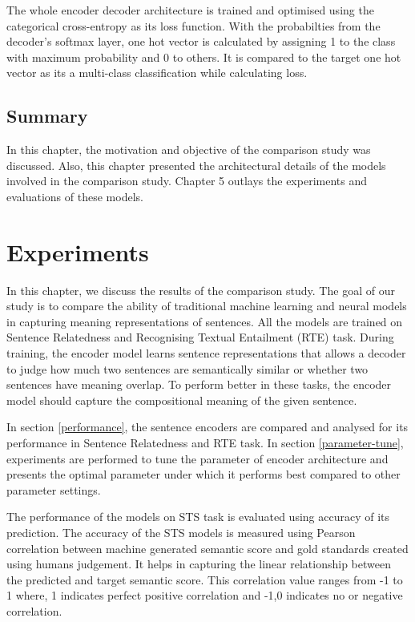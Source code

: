 \documentclass[12pt]{report} %
\begin{document}
	The whole encoder decoder architecture is trained  and optimised using the categorical cross-entropy as its loss function. With the probabilties from the decoder's softmax layer, one hot vector is calculated by assigning 1 to the class with maximum probability and 0 to others. It is compared to the target one hot vector as its a multi-class classification while calculating loss.
	
	\section{Summary}
	In this chapter, the motivation and objective of the comparison study was discussed. Also, this chapter presented the architectural details of the models involved in the comparison study. Chapter 5 outlays the experiments and evaluations of these models.
	
	  
	 
\chapter{Experiments}

 In this chapter, we discuss the results of the comparison study. The goal of our study is to compare the ability of traditional machine learning and neural models in capturing meaning representations of sentences. All the models are trained on Sentence Relatedness and Recognising Textual Entailment (RTE) task. During training, the encoder model learns sentence representations that allows a decoder to judge how much two sentences are semantically similar or whether two sentences have meaning overlap. To perform better in these tasks, the encoder model should capture the compositional meaning of the given sentence. 
 
 In section \ref{performance}, the sentence encoders are compared and analysed for its performance in Sentence Relatedness and RTE task. In section \ref{parameter-tune}, experiments are performed to tune the parameter of encoder architecture and presents the optimal parameter under which it performs best compared to other parameter
 settings.
 
 The performance of the models on STS task is evaluated using accuracy of its prediction. The accuracy of the STS models is measured using Pearson correlation between machine generated semantic score and gold standards created using humans judgement. It helps in capturing the linear relationship between the predicted and target semantic score. This correlation value ranges from -1 to 1 where, 1 indicates perfect positive correlation and -1,0 indicates no or negative correlation.
 
\end{document}
